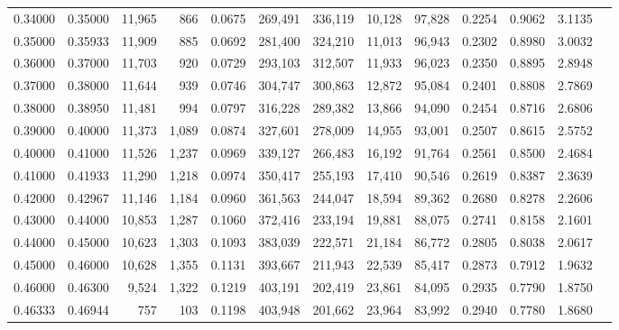 \begin{tabular}{rrrrrrrrrrrrr}
0.34000 & 0.35000 & 11,965 &   866 &                                     0.0675 & 269,491 & 336,119 &  10,128 &  97,828 & 0.2254 & 0.9062 & 3.1135 \\
0.35000 & 0.35933 & 11,909 &   885 &                                     0.0692 & 281,400 & 324,210 &  11,013 &  96,943 & 0.2302 & 0.8980 & 3.0032 \\
0.36000 & 0.37000 & 11,703 &   920 &                                     0.0729 & 293,103 & 312,507 &  11,933 &  96,023 & 0.2350 & 0.8895 & 2.8948 \\
0.37000 & 0.38000 & 11,644 &   939 &                                     0.0746 & 304,747 & 300,863 &  12,872 &  95,084 & 0.2401 & 0.8808 & 2.7869 \\
0.38000 & 0.38950 & 11,481 &   994 &                                     0.0797 & 316,228 & 289,382 &  13,866 &  94,090 & 0.2454 & 0.8716 & 2.6806 \\
0.39000 & 0.40000 & 11,373 & 1,089 &                                     0.0874 & 327,601 & 278,009 &  14,955 &  93,001 & 0.2507 & 0.8615 & 2.5752 \\
0.40000 & 0.41000 & 11,526 & 1,237 &                                     0.0969 & 339,127 & 266,483 &  16,192 &  91,764 & 0.2561 & 0.8500 & 2.4684 \\
0.41000 & 0.41933 & 11,290 & 1,218 &                                     0.0974 & 350,417 & 255,193 &  17,410 &  90,546 & 0.2619 & 0.8387 & 2.3639 \\
0.42000 & 0.42967 & 11,146 & 1,184 &                                     0.0960 & 361,563 & 244,047 &  18,594 &  89,362 & 0.2680 & 0.8278 & 2.2606 \\
0.43000 & 0.44000 & 10,853 & 1,287 &                                     0.1060 & 372,416 & 233,194 &  19,881 &  88,075 & 0.2741 & 0.8158 & 2.1601 \\
0.44000 & 0.45000 & 10,623 & 1,303 &                                     0.1093 & 383,039 & 222,571 &  21,184 &  86,772 & 0.2805 & 0.8038 & 2.0617 \\
0.45000 & 0.46000 & 10,628 & 1,355 &                                     0.1131 & 393,667 & 211,943 &  22,539 &  85,417 & 0.2873 & 0.7912 & 1.9632 \\
0.46000 & 0.46300 &  9,524 & 1,322 &                                     0.1219 & 403,191 & 202,419 &  23,861 &  84,095 & 0.2935 & 0.7790 & 1.8750 \\
0.46333 & 0.46944 &    757 &   103 &                                     0.1198 & 403,948 & 201,662 &  23,964 &  83,992 & 0.2940 & 0.7780 & 1.8680 \\

\end{tabular}
